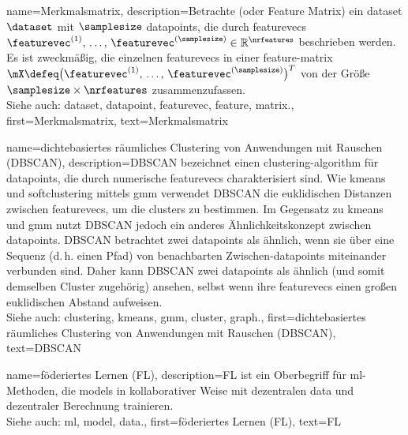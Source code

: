 {{{{
{name={Merkmalsmatrix}, 
	description={Betrachte \cite{Eisenberg2008Merkmalsmatrix} (oder Feature Matrix) ein \gls{dataset} $\dataset$ 
		mit $\samplesize$ \glspl{datapoint}, die durch \glspl{featurevec} 
		$\featurevec^{(1)}, \,\ldots, \,\featurevec^{(\samplesize)} \in \mathbb{R}^{\nrfeatures}$ beschrieben werden. 
		Es ist zweckmäßig, die einzelnen \glspl{featurevec} in einer \gls{feature}-\gls{matrix} 
		$\mX \defeq \big(\featurevec^{(1)}, \,\ldots, \,\featurevec^{(\samplesize)}\big)^{T}$ 
		von der Größe $\samplesize \times \nrfeatures$ zusammenzufassen.
				\\
		Siehe auch: \gls{dataset}, \gls{datapoint}, \gls{featurevec}, \gls{feature}, \gls{matrix}.},
	first={Merkmalsmatrix},
	text={Merkmalsmatrix} 
}



{name={dichtebasiertes räumliches Clustering von Anwendungen mit Rauschen (DBSCAN)}, 
	description={DBSCAN 
		bezeichnet einen \gls{clustering}-\gls{algorithm} für \glspl{datapoint}, 
		die durch numerische \glspl{featurevec} charakterisiert sind. 
		Wie \gls{kmeans} und \gls{softclustering} mittels \gls{gmm} verwendet DBSCAN 
		die euklidischen Distanzen zwischen \glspl{featurevec}, um die \glspl{cluster} zu bestimmen. 
		Im Gegensatz zu \gls{kmeans} und \gls{gmm} nutzt DBSCAN jedoch ein anderes Ähnlichkeitskonzept 
		zwischen \glspl{datapoint}. 
		DBSCAN betrachtet zwei \glspl{datapoint} als ähnlich, wenn sie über eine Sequenz 
		(d.\,h. einen Pfad) von benachbarten Zwischen-\glspl{datapoint} miteinander verbunden sind. 
		Daher kann DBSCAN zwei \glspl{datapoint} als ähnlich (und somit demselben Cluster zugehörig) ansehen, 
		selbst wenn ihre \glspl{featurevec} einen großen euklidischen Abstand aufweisen.
				\\
		Siehe auch: \gls{clustering}, \gls{kmeans}, \gls{gmm}, \gls{cluster}, \gls{graph}.},
	first={dichtebasiertes räumliches Clustering von Anwendungen mit Rauschen (DBSCAN)},
	text={DBSCAN} 
}

{name={föderiertes Lernen (FL)}, 
	description={FL 
		ist ein Oberbegriff für \gls{ml}-Methoden, die \glspl{model} 
		in kollaborativer Weise mit dezentralen \gls{data} und dezentraler Berechnung trainieren.
				\\
		Siehe auch: \gls{ml}, \gls{model}, \gls{data}.},
	first={föderiertes Lernen (FL)},
	text={FL} 
}

}}}}
